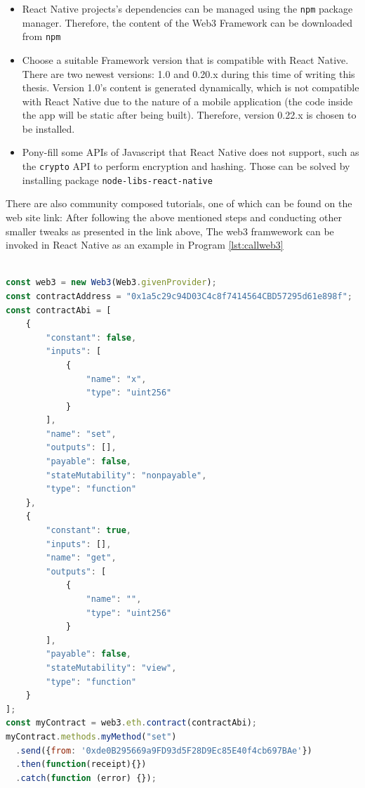 \documentclass[twoside,draftfooter]{tutthesis} %
\begin{document}
\begin{itemize}
    \item React Native projects's dependencies can be managed using the \texttt{npm} package manager. Therefore, the content of the Web3 Framework can be downloaded from \texttt{npm}
    \item Choose a suitable Framework version that is compatible with React Native. There are two newest versions: 1.0 and 0.20.x during this time of writing this thesis. Version 1.0's content is generated dynamically, which is not compatible with React Native due to the nature of a mobile application (the code inside the app will be static after being built). Therefore, version 0.22.x is chosen to be installed.
    \item Pony-fill some APIs of Javascript that React Native does not support, such as the \texttt{crypto} API to perform encryption and hashing. Those can be solved by installing package \texttt{node-libs-react-native}
\end{itemize}

There are also community composed tutorials, one of which can be found on the web site link: \citep{InstallWeb3}
After following the above mentioned steps and conducting other smaller tweaks as presented in the link above, The web3 framwework can be invoked in React Native as an example in Program \ref{lst:callweb3}

\begin{lstlisting}[float,caption={Calling Web3 functions and making transactions on the Ethereum blockchain \citep{SolidityDocumentation}.},label={lst:callweb3},language=Javascript]

const web3 = new Web3(Web3.givenProvider);
const contractAddress = "0x1a5c29c94D03C4c8f7414564CBD57295d61e898f";
const contractAbi = [
	{
		"constant": false,
		"inputs": [
			{
				"name": "x",
				"type": "uint256"
			}
		],
		"name": "set",
		"outputs": [],
		"payable": false,
		"stateMutability": "nonpayable",
		"type": "function"
	},
	{
		"constant": true,
		"inputs": [],
		"name": "get",
		"outputs": [
			{
				"name": "",
				"type": "uint256"
			}
		],
		"payable": false,
		"stateMutability": "view",
		"type": "function"
	}
];
const myContract = web3.eth.contract(contractAbi);
myContract.methods.myMethod("set")
  .send({from: '0xde0B295669a9FD93d5F28D9Ec85E40f4cb697BAe'})
  .then(function(receipt){})
  .catch(function (error) {});

\end{lstlisting}
\end{document}
